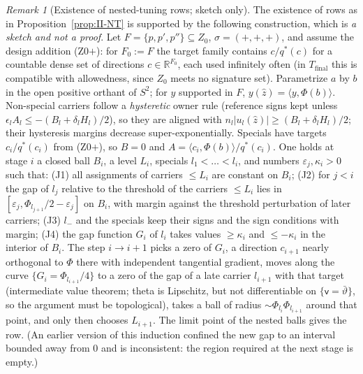 \documentclass[10pt]{amsart}
\theoremstyle{definition}
\theoremstyle{remark}
\newtheorem{remark}[theorem]{Remark}
\newcommand{\R}{\mathbb R}
\newcommand{\zh}{\hat z}
\newcommand{\ip}[2]{\langle #1,#2\rangle}
\begin{document}
\begin{remark}[Existence of nested-tuning rows; sketch only]\label{rem:II-NTexist}
The existence of rows as in Proposition~\ref{prop:II-NT} is supported by the
following construction, which is \emph{a sketch and not a proof}.  Let $F=\{p,p',p''\}
\subseteq Z_0$, $\sigma=(+,+,+)$, and assume the design addition (Z0$+$): for $F_0:=F$ the
target family contains $c/q^*(c)$ for a countable dense set of directions $c\in\R^{F_0}$,
each used infinitely often (in $T_{\mathrm{final}}$ this is compatible with
allowedness, since $Z_0$ meets no signature set).  Parametrize $a$ by $b$ in the
open positive orthant of $S^2$; for $y$ supported in $F$, $y(\zh)=\ip y{\Phi(b)}$.
Non-special carriers follow a \emph{hysteretic} owner rule (reference signs kept
unless $\epsilon_lA_l\le-(B_l+\delta_lH_l)/2$), so they are aligned with $n_l|u_l(\zh)|\ge(B_l+
\delta_lH_l)/2$; their hysteresis margins decrease super-exponentially.  Specials have
targets $c_i/q^*(c_i)$ from (Z0$+$), so $B=0$ and $A=\ip{c_i}{\Phi(b)}/q^*(c_i)$.  One
holds at stage $i$ a closed ball $B_i$, a level $L_i$, specials $l_1<\dots<l_i$, and
numbers $\varepsilon_j,\kappa_i>0$ such that: (J1) all assignments of carriers $\le L_i$ are
constant on $B_i$; (J2) for $j<i$ the gap of $l_j$ relative to the threshold of the
carriers $\le L_i$ lies in $[\varepsilon_j,\Phi_{l_{j+1}}/2-\varepsilon_j]$ on $B_i$, with margin against
the threshold perturbation of later carriers; (J3) $l_-$ and the specials keep their
signs and the sign conditions with margin; (J4) the gap function $G_i$ of $l_i$ takes
values $\ge\kappa_i$ and $\le-\kappa_i$ in the interior of $B_i$.  The step $i\to i+1$ picks a
zero of $G_i$, a direction $c_{i+1}$ nearly orthogonal to $\Phi$ there with
independent tangential gradient, moves along the curve $\{G_i=\Phi_{l_{i+1}}/4\}$ to a
zero of the gap of a late carrier $l_{i+1}$ with that target (intermediate value
theorem; theta is Lipschitz, but not differentiable on $\{\mathsf v=\bar\vartheta\}$, so
the argument must be topological), takes a ball of radius $\sim\Phi_{l_i}\Phi_{l_{i+1}}$
around that point, and only then chooses $L_{i+1}$.  The limit point of the nested
balls gives the row.  (An earlier version of this induction confined the new gap
to an interval bounded away from $0$ and is inconsistent: the region required at
the next stage is empty.)
\end{remark}
\end{document}
